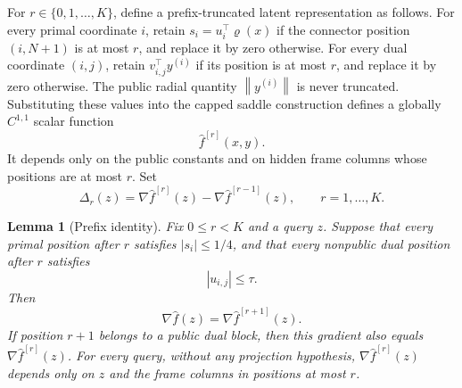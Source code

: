 \documentclass[11pt,a4paper]{article}
\newcommand{\norm}[1]{\left\lVert #1\right\rVert}
\newtheorem{lemma}[theorem]{Lemma}
\theoremstyle{definition}
\theoremstyle{remark}
\numberwithin{equation}{section}
\begin{document}
For $r\in\{0,1,\ldots,K\}$, define a prefix-truncated latent representation as follows.
For every primal coordinate $i$, retain $s_i=u_i^\top\varrho(x)$ if the connector position $(i,N+1)$ is at most $r$, and replace it by zero otherwise.  For every dual coordinate $(i,j)$, retain $v_{i,j}^\top y^{(i)}$ if its position is at most $r$, and replace it by zero otherwise.  The public radial quantity $\norm{y^{(i)}}$ is never truncated.  Substituting these values into the capped saddle construction defines a globally $C^{1,1}$ scalar function
\begin{equation}
 \widehat f^{[r]}(x,y).
 \label{eq:prefix-function}
\end{equation}
It depends only on the public constants and on hidden frame columns whose positions are at most $r$.  Set
\begin{equation}
 \Delta_r(z)=\nabla\widehat f^{[r]}(z)-\nabla\widehat f^{[r-1]}(z),
 \qquad r=1,\ldots,K.
 \label{eq:prefix-increment}
\end{equation}

\begin{lemma}[Prefix identity]
\label{lem:prefix-identity}
Fix $0\le r<K$ and a query $z$.  Suppose that every primal position
after $r$ satisfies $|s_i|\le1/4$, and that every nonpublic dual position
after $r$ satisfies
\begin{equation}
 |u_{i,j}|\le\tau.
 \label{eq:prefix-dead-zone}
\end{equation}
Then
\begin{equation}
 \nabla\widehat f(z)=\nabla\widehat f^{[r+1]}(z).
 \label{eq:prefix-equality}
\end{equation}
If position $r+1$ belongs to a public dual block, then this gradient also
equals $\nabla\widehat f^{[r]}(z)$.  For every query, without any
projection hypothesis, $\nabla\widehat f^{[r]}(z)$ depends only on $z$
and the frame columns in positions at most $r$.
\end{lemma}
\end{document}
